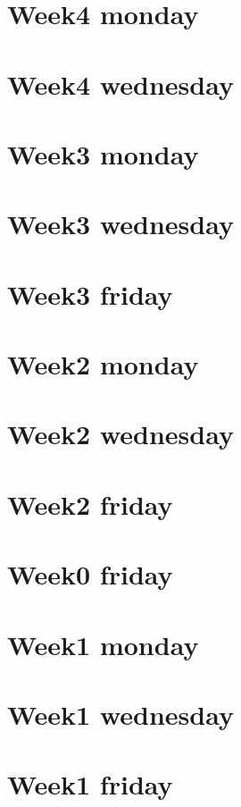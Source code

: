 
\section*{Week4 monday}

\vfill
\section*{Week4 wednesday}

\vfill
\section*{Week3 monday}

\vfill
\section*{Week3 wednesday}

\vfill
\section*{Week3 friday}

\vfill
\section*{Week2 monday}

\vfill
\section*{Week2 wednesday}

\vfill
\section*{Week2 friday}

\vfill
\section*{Week0 friday}

\vfill
\section*{Week1 monday}

\vfill
\section*{Week1 wednesday}

\vfill
\section*{Week1 friday}

\vfill
